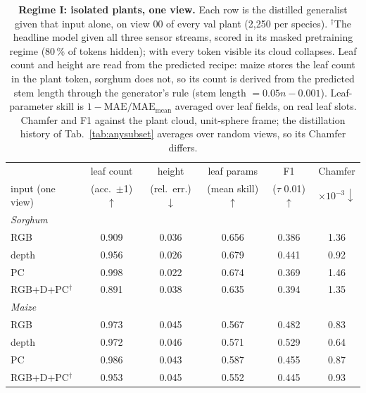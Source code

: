 \begin{table}[t]
  \centering\scriptsize
  \setlength{\tabcolsep}{3.2pt}
  \begin{tabular}{l cc c cc}
    \toprule
    & leaf count & height & leaf params & F1 & Chamfer \\
    input (one view) & (acc.\ $\pm$1) $\uparrow$ & (rel.\ err.) $\downarrow$ & (mean skill) $\uparrow$ & ($\tau$ 0.01) $\uparrow$ & $\times10^{-3}\downarrow$ \\
    \midrule
    \multicolumn{6}{l}{\emph{Sorghum}} \\
    RGB                 & 0.909 & 0.036 & 0.656 & 0.386 & 1.36 \\
    depth               & 0.956 & 0.026 & 0.679 & 0.441 & 0.92 \\
    PC                  & 0.998 & 0.022 & 0.674 & 0.369 & 1.46 \\
    RGB+D+PC$^\dagger$  & 0.891 & 0.038 & 0.635 & 0.394 & 1.35 \\
    \midrule
    \multicolumn{6}{l}{\emph{Maize}} \\
    RGB                 & 0.973 & 0.045 & 0.567 & 0.482 & 0.83 \\
    depth               & 0.972 & 0.046 & 0.571 & 0.529 & 0.64 \\
    PC                  & 0.986 & 0.043 & 0.587 & 0.455 & 0.87 \\
    RGB+D+PC$^\dagger$  & 0.953 & 0.045 & 0.552 & 0.445 & 0.93 \\
    \bottomrule
  \end{tabular}
  \caption{\textbf{Regime I: isolated plants, one view.} Each row is the
  distilled generalist given that input alone, on view 00 of every val plant
  (2{,}250 per species). $^\dagger$The headline model given all three sensor
  streams, scored in its masked pretraining regime (80\,\% of tokens hidden);
  with every token visible its cloud collapses. Leaf count and height are read
  from the predicted recipe: maize stores the leaf count in the plant token,
  sorghum does not, so its count is derived from the predicted stem length
  through the generator's rule (stem length $= 0.05n - 0.001$). Leaf-parameter
  skill is $1-\mathrm{MAE}/\mathrm{MAE}_{\text{mean}}$ averaged over leaf fields,
  on real leaf slots. Chamfer and F1 against the plant cloud, unit-sphere frame;
  the distillation history of Tab.~\ref{tab:anysubset} averages over random views,
  so its Chamfer differs. }
  \label{tab:regime1}
\end{table}


